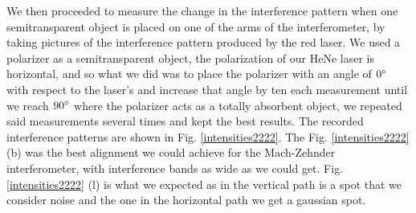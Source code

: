 \documentclass[12pt]{book}
\begin{document}
We then proceeded to measure the change in the interference pattern when one semitransparent object is placed on one of the arms of the interferometer, by taking pictures of the interference pattern produced by the red laser. We used a polarizer as a semitransparent object, the polarization of our HeNe laser is horizontal, and so what we did was to place the polarizer with an angle of $0\degree$ with respect to the laser's and increase that angle by ten each measurement until we reach $90\degree$ where the polarizer acts as a totally absorbent object, we repeated said measurements several times and kept the best results. The recorded interference patterns are shown in Fig. \ref{intensities2222}. The Fig. \ref{intensities2222} (b) was the best alignment we could achieve for the Mach-Zehnder interferometer, with interference bands as wide as we could get. Fig. \ref{intensities2222} (l) is what we expected as in the vertical path is a spot that we consider noise and the one in the horizontal path we get a gaussian spot. 
\end{document}
